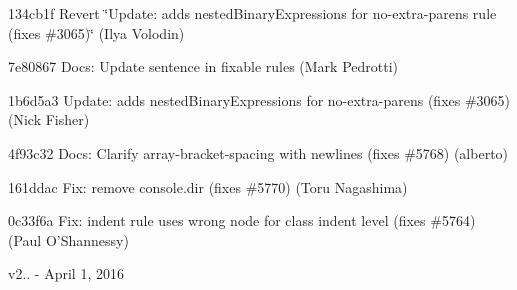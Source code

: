 \begin{DoxyItemize}
\item 134cb1f Revert \char`\"{}\+Update\+: adds nested\+Binary\+Expressions for no-\/extra-\/parens rule (fixes \#3065)\char`\"{} (Ilya Volodin)
\item 7e80867 Docs\+: Update sentence in fixable rules (Mark Pedrotti)
\item 1b6d5a3 Update\+: adds nested\+Binary\+Expressions for no-\/extra-\/parens (fixes \#3065) (Nick Fisher)
\item 4f93c32 Docs\+: Clarify {\ttfamily array-\/bracket-\/spacing} with newlines (fixes \#5768) (alberto)
\item 161ddac Fix\+: remove {\ttfamily console.\+dir} (fixes \#5770) (Toru Nagashima)
\item 0c33f6a Fix\+: indent rule uses wrong node for class indent level (fixes \#5764) (Paul O’\+Shannessy)
\end{DoxyItemize}

v2.. -\/ April 1, 2016


